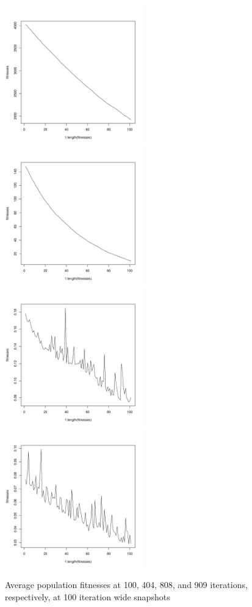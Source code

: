 \documentclass[12pt]{article}
\begin{document}
\begin{figure}[!h]
        \begin{center}
		\includegraphics[width=60mm]{images/rosenbrock.ss/avg_101.pdf}
		\includegraphics[width=60mm]{images/rosenbrock.ss/avg_404.pdf}
		\includegraphics[width=60mm]{images/rosenbrock.ss/avg_808.pdf}
		\includegraphics[width=60mm]{images/rosenbrock.ss/avg_909.pdf}
               	\caption{Average population fitnesses at 100, 404, 808, and 909 iterations, respectively, at 100 iteration wide snapshots}
                \label{rosenbrock_ss_avg_pop_fit}
        \end{center}
\end{figure}
\end{document}
